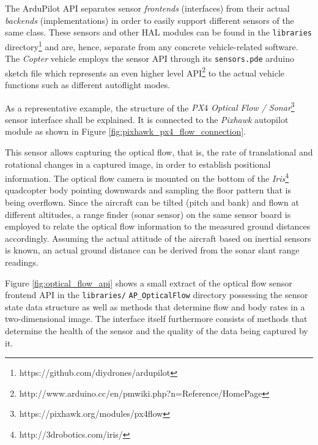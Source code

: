 \documentclass[paper=letter, fontsize=11pt]{scrartcl}
\numberwithin{equation}{section}
\numberwithin{figure}{section}
\numberwithin{table}{section}
\begin{document}
\par
The {ArduPilot} \ac{API} separates sensor {\em frontends} (interfaces) from
their actual {\em backends} (implementations) in order to easily support
different sensors of the same class. These sensors and other \ac{HAL} modules
can be found in the \texttt{libraries}
directory\footnote{https://github.com/diydrones/ardupilot} and are, hence,
separate from any concrete vehicle-related software. The {\em Copter} vehicle
employs the sensor \ac{API} through its \texttt{sensors.pde} arduino sketch
file which represents an even higher level
\ac{API}\footnote{http://www.arduino.cc/en/pmwiki.php?n=Reference/HomePage}
to the actual vehicle functions such as different autoflight modes.
\newline

\par
As a representative example, the structure of the {\em PX$4$ Optical Flow /
Sonar}\footnote{https://pixhawk.org/modules/px4flow} sensor interface shall be
explained. It is connected to the {\em Pixhawk} autopilot module as shown in
Figure \ref{fig:pixhawk_px4_flow_connection}.

\par
This sensor allows capturing the optical flow, that is, the rate of
translational and rotational changes in a captured image, in order to establish
positional information. The optical flow camera is mounted on the bottom of the
{\em Iris}\footnote{http://3drobotics.com/iris/} quadcopter body pointing
downwards and sampling the floor pattern that is being overflown. Since the
aircraft can be tilted (pitch and bank) and flown at different altitudes, a
range finder (sonar sensor) on the same sensor board is employed to relate the
optical flow information to the measured ground distances accordingly. Assuming
the actual attitude of the aircraft based on inertial sensors is known, an
actual ground distance can be derived from the sonar slant range readings.
\newline

\par
Figure \ref{fig:optical_flow_api} shows a small extract of the optical flow
sensor frontend \ac{API} in the \texttt{libraries/} \texttt{AP\_OpticalFlow}
directory possessing the sensor state data structure as well as methods that determine
flow and body rates in a two-dimensional image. The interface itself
furthermore consists of methods that determine the health of the sensor and the
quality of the data being captured by it.
\newline
\end{document}
